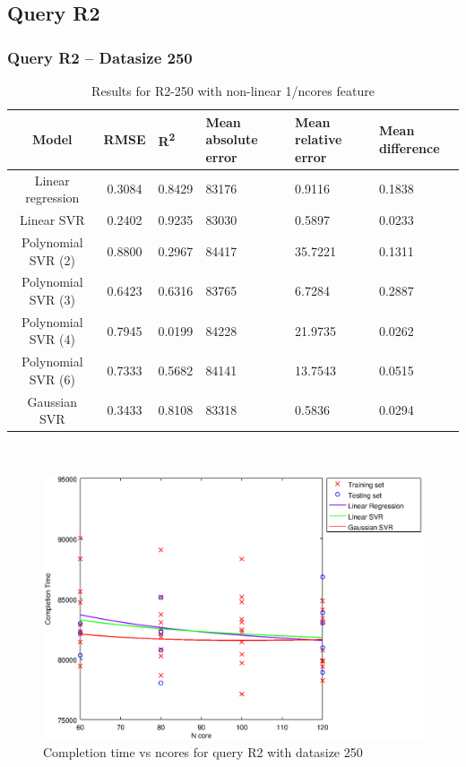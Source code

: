 \documentclass[a4paper,11pt]{article}
\begin{document}
\newpage
\subsection{Query R2}
\subsubsection{Query R2 -- Datasize 250}
\begin{table}[H]
	\centering
	\begin{adjustbox}{center}
		\begin{tabular}{c | c M{1.2cm} M{2.5cm} M{2.5cm} M{1.8cm}}
			Model & RMSE & R\textsuperscript{2} & Mean absolute error & Mean relative error & Mean difference \tabularnewline
			\hline
			Linear regression & 0.3084 & 0.8429 &  83176 & 0.9116 & 0.1838 \\
			Linear SVR & 0.2402 & 0.9235 &  83030 & 0.5897 & 0.0233 \\
			Polynomial SVR (2) & 0.8800 & 0.2967 &  84417 & 35.7221 & 0.1311 \\
			Polynomial SVR (3) & 0.6423 & 0.6316 &  83765 & 6.7284 & 0.2887 \\
			Polynomial SVR (4) & 0.7945 & 0.0199 &  84228 & 21.9735 & 0.0262 \\
			Polynomial SVR (6) & 0.7333 & 0.5682 &  84141 & 13.7543 & 0.0515 \\
			Gaussian SVR & 0.3433 & 0.8108 &  83318 & 0.5836 & 0.0294 \\
		\end{tabular}
	\end{adjustbox}
	\\
	\caption{Results for R2-250 with non-linear 1/ncores feature}
	\label{table_R2_prediction_all}
\end{table}

\begin {figure}[hbtp]
\centering
\includegraphics[width=\textwidth]{output/R2_250_NO_72_90_1_OVER_NCORES/plot_R2_250_bestmodels.eps}
\caption {Completion time vs ncores for query R2 with datasize 250}
\end {figure}
\end{document}
